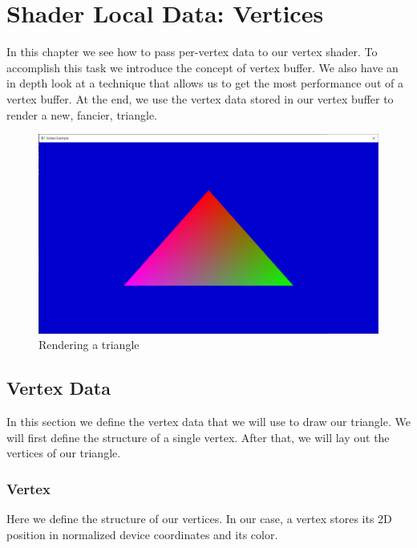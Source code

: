 \chapter{Shader Local Data: Vertices}

In this chapter we see how to pass per-vertex data to our vertex shader.
To accomplish this task we introduce the concept of vertex buffer.
We also have an in depth look at a technique that allows us to get
the most performance out of a vertex buffer.
At the end, we use the vertex data stored in our vertex buffer to render
a new, fancier, triangle.

\begin{figure}[ht]
    \centering
    \includegraphics[scale=0.20]{images/ChVertices/RenderTriangle.png}
    \caption{Rendering a triangle}
    \label{fig::RenderTriangleVertices}
\end{figure}

\section{Vertex Data}

In this section we define the vertex data that we will use to draw our triangle.
We will first define the structure of a single vertex.
After that, we will lay out the vertices of our triangle.

\subsection{Vertex}

Here we define the structure of our vertices.
In our case, a vertex stores its 2D position in normalized device coordinates
and its color.

\begin{minipage}{\linewidth}{\noindent}
    
\end{minipage}

